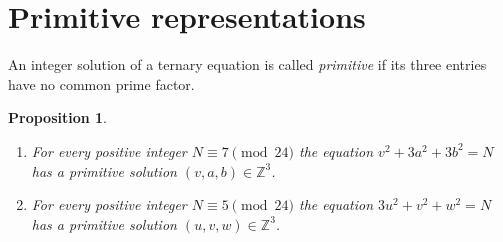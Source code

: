 \documentclass[11pt]{amsart}
\newtheorem{proposition}[theorem]{Proposition}
\theoremstyle{definition}
\theoremstyle{remark}
\newcommand{\Z}{\mathbb{Z}}
\begin{document}
\section{Primitive representations}\label{sec:seed}

An integer solution of a ternary equation is called \emph{primitive} if its three entries have no common prime factor.

\begin{proposition}\label{prop:classical}
\begin{enumerate}
\item[(a)] For every positive integer $N\equiv 7\pmod{24}$ the equation $v^2+3a^2+3b^2=N$ has a primitive solution $(v,a,b)\in\Z^3$.
\item[(b)] For every positive integer $N\equiv 5\pmod{24}$ the equation $3u^2+v^2+w^2=N$ has a primitive solution $(u,v,w)\in\Z^3$.
\end{enumerate}
\end{proposition}
\end{document}
